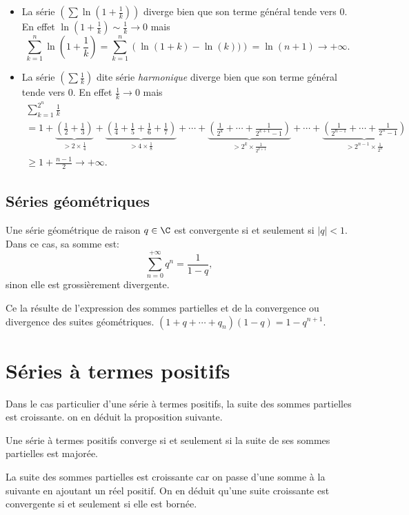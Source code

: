\begin{itemize}
 \item La série $\left( \sum \ln(1+\frac{1}{k}) \right)$ diverge bien que son terme général tende vers $0$. En effet $\ln(1+\frac{1}{k}) \sim \frac{1}{k} \rightarrow 0$ mais 
 \[
  \sum_{k=1}^{n}\ln(1+\frac{1}{k}) = \sum_{k=1}^{n}\left( \ln(1+k) - \ln(k))\right) = \ln(n+1) \rightarrow +\infty. 
 \]
 
 \item La série $\left( \sum \frac{1}{k} \right)$ dite série \emph{harmonique}  diverge bien que son terme général tende vers $0$. En effet $\frac{1}{k} \rightarrow 0$ mais
 \begin{multline*}
  \sum_{k=1}^{2^n}\frac{1}{k}\\  
  = 1 
  + \underset{> 2\times \frac{1}{4}}{\underbrace{\left( \frac{1}{2} + \frac{1}{3}\right)}} 
  + \underset{> 4 \times\frac{1}{8}}{\underbrace{\left( \frac{1}{4} + \frac{1}{5} + \frac{1}{6} +\frac{1}{7}\right)}}
  + \cdots 
  + \underset{> 2^k \times \frac{1}{2^{k+1}}}{\underbrace{\left( \frac{1}{2^{k}} + \cdots + \frac{1}{2^{k+1}-1}\right)}} + \cdots 
  + \underset{> 2^{n-1} \times \frac{1}{2^{n}}}{\underbrace{\left( \frac{1}{2^{n-1}} + \cdots + \frac{1}{2^{n}-1}\right)}}\\
  \geq 1 + \frac{n-1}{2} \rightarrow + \infty.
 \end{multline*}
\end{itemize}

\subsection{Séries géométriques}
Une série géométrique de raison $q \in \C$ est convergente si et seulement si $|q|<1$. Dans ce cas, sa somme est:
\begin{displaymath}
  \sum_{n=0}^{+\infty} q^n = \frac{1}{1-q},
\end{displaymath}
sinon elle est grossièrement divergente.
\begin{demo}
Ce la résulte de l'expression des sommes partielles et de la convergence ou divergence des suites géométriques.  $(1+q+\cdots + q_n)(1-q) = 1- q^{n+1}$.
\end{demo}


\section{Séries à termes positifs}
Dans le cas particulier d'une série à termes positifs, la suite des sommes partielles est croissante. on en déduit la proposition suivante.
\begin{prop}
  Une série à termes positifs converge si et seulement si la suite de ses sommes partielles est majorée.
\end{prop}
\begin{demo}
 La suite des sommes partielles est croissante car on passe d'une somme à la suivante en ajoutant un réel positif. On en déduit qu'une suite croissante est convergente si et seulement si elle est bornée.
\end{demo}

